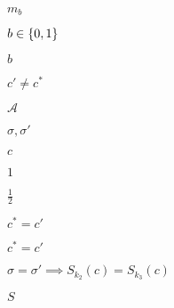 \documentclass[10pt]{book}
\begin{document}
\begin{mdSnippets}
\begin{mdInlineSnippet}[7960e7402c420dc1ba0324867807f1f6]
$m_b$\end{mdInlineSnippet}%
\begin{mdInlineSnippet}[6892f7e7c3b8ecc19e4a077e82515567]%
$b \in \{0,1\}$\end{mdInlineSnippet}%
\begin{mdInlineSnippet}%
$b$\end{mdInlineSnippet}%
\begin{mdInlineSnippet}[524330cee1943c719d608d0905e402f6]%
$c' \neq c^*$\end{mdInlineSnippet}%
\begin{mdInlineSnippet}[ad70146b431bea9ae74cf8385470c544]%
$\mathcal{A}$\end{mdInlineSnippet}%
\begin{mdInlineSnippet}[fd05346104b1140b75fe5ce2ca2dda8a]%
$\sigma, \sigma'$\end{mdInlineSnippet}%
\begin{mdInlineSnippet}[4a8a08f09d37b73795649038408b5f33]%
$c$\end{mdInlineSnippet}%
\begin{mdInlineSnippet}[c4ca4238a0b923820dcc509a6f75849b]%
$1$\end{mdInlineSnippet}%
\begin{mdInlineSnippet}[93b05c90d14a117ba52da1d743a43ab1]%
$\frac{1}{2}$\end{mdInlineSnippet}%
\begin{mdInlineSnippet}[a396254ccc344c916be13bd1ee2ed56b]%
$c^* = c'$\end{mdInlineSnippet}%
\begin{mdInlineSnippet}[a396254ccc344c916be13bd1ee2ed56b]%
$c^* = c'$\end{mdInlineSnippet}%
\begin{mdInlineSnippet}[d656704d4881548d166b06b8b5565127]%
$\sigma = \sigma' \implies S_{k_2}(c) = S_{k_3}(c)$\end{mdInlineSnippet}%
\begin{mdInlineSnippet}%
$S$\end{mdInlineSnippet}%
\begin{mdInlineSnippet}[ad5934992922425f0c879d895195ce24]%

\end{mdInlineSnippet}
\end{mdSnippets}
\end{document}
